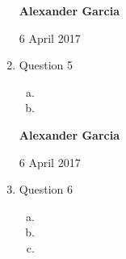 \documentclass[11pt]{article}
\begin{document}
\begin{enumerate}
		\newpage

		\textbf{Alexander Garcia}

		6 April 2017 \\

	\item Question 5

		\begin{enumerate}[(a)]

			\item

			\item

		\end{enumerate}

		\newpage

		\textbf{Alexander Garcia}

		6 April 2017 \\

	\item Question 6

		\begin{enumerate}[(a)]

			\item

			\item

			\item

		\end{enumerate}

\end{enumerate}
\end{document}
